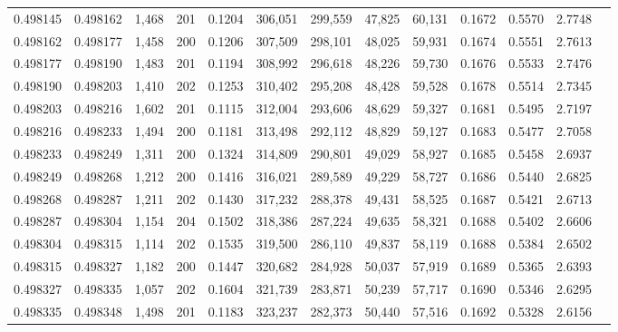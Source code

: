 \begin{tabular}{rrrrrrrrrrrrr}
0.498145 & 0.498162 & 1,468 & 201 &                                     0.1204 & 306,051 & 299,559 &  47,825 &  60,131 & 0.1672 & 0.5570 & 2.7748 \\
0.498162 & 0.498177 & 1,458 & 200 &                                     0.1206 & 307,509 & 298,101 &  48,025 &  59,931 & 0.1674 & 0.5551 & 2.7613 \\
0.498177 & 0.498190 & 1,483 & 201 &                                     0.1194 & 308,992 & 296,618 &  48,226 &  59,730 & 0.1676 & 0.5533 & 2.7476 \\
0.498190 & 0.498203 & 1,410 & 202 &                                     0.1253 & 310,402 & 295,208 &  48,428 &  59,528 & 0.1678 & 0.5514 & 2.7345 \\
0.498203 & 0.498216 & 1,602 & 201 &                                     0.1115 & 312,004 & 293,606 &  48,629 &  59,327 & 0.1681 & 0.5495 & 2.7197 \\
0.498216 & 0.498233 & 1,494 & 200 &                                     0.1181 & 313,498 & 292,112 &  48,829 &  59,127 & 0.1683 & 0.5477 & 2.7058 \\
0.498233 & 0.498249 & 1,311 & 200 &                                     0.1324 & 314,809 & 290,801 &  49,029 &  58,927 & 0.1685 & 0.5458 & 2.6937 \\
0.498249 & 0.498268 & 1,212 & 200 &                                     0.1416 & 316,021 & 289,589 &  49,229 &  58,727 & 0.1686 & 0.5440 & 2.6825 \\
0.498268 & 0.498287 & 1,211 & 202 &                                     0.1430 & 317,232 & 288,378 &  49,431 &  58,525 & 0.1687 & 0.5421 & 2.6713 \\
0.498287 & 0.498304 & 1,154 & 204 &                                     0.1502 & 318,386 & 287,224 &  49,635 &  58,321 & 0.1688 & 0.5402 & 2.6606 \\
0.498304 & 0.498315 & 1,114 & 202 &                                     0.1535 & 319,500 & 286,110 &  49,837 &  58,119 & 0.1688 & 0.5384 & 2.6502 \\
0.498315 & 0.498327 & 1,182 & 200 &                                     0.1447 & 320,682 & 284,928 &  50,037 &  57,919 & 0.1689 & 0.5365 & 2.6393 \\
0.498327 & 0.498335 & 1,057 & 202 &                                     0.1604 & 321,739 & 283,871 &  50,239 &  57,717 & 0.1690 & 0.5346 & 2.6295 \\
0.498335 & 0.498348 & 1,498 & 201 &                                     0.1183 & 323,237 & 282,373 &  50,440 &  57,516 & 0.1692 & 0.5328 & 2.6156 \\

\end{tabular}
